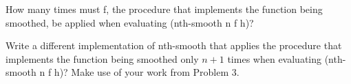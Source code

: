 
How many times must {\cf f}, the procedure that implements the
function being smoothed, be applied when evaluating {\cf (nth-smooth n f h)}?


Write a different implementation of {\cf nth-smooth} that applies the procedure
that implements the function being smoothed only $n+1$ times when evaluating
{\cf (nth-smooth n f h)}?  Make use of your work from Problem 3.


